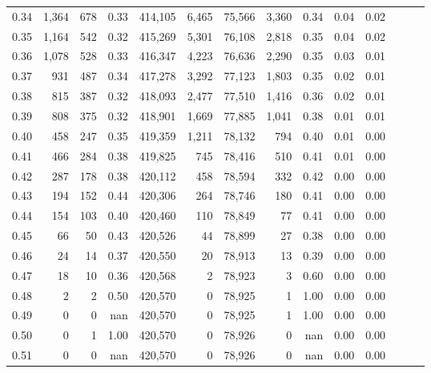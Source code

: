 \begin{tabular}{rrrrrrrrrrrrrr}
0.34 &   1,364 &    678 &  0.33 &  414,105 &    6,465 &  75,566 &   3,360 &  0.34 &  0.04 &      0.02 \\
0.35 &   1,164 &    542 &  0.32 &  415,269 &    5,301 &  76,108 &   2,818 &  0.35 &  0.04 &      0.02 \\
0.36 &   1,078 &    528 &  0.33 &  416,347 &    4,223 &  76,636 &   2,290 &  0.35 &  0.03 &      0.01 \\
0.37 &     931 &    487 &  0.34 &  417,278 &    3,292 &  77,123 &   1,803 &  0.35 &  0.02 &      0.01 \\
0.38 &     815 &    387 &  0.32 &  418,093 &    2,477 &  77,510 &   1,416 &  0.36 &  0.02 &      0.01 \\
0.39 &     808 &    375 &  0.32 &  418,901 &    1,669 &  77,885 &   1,041 &  0.38 &  0.01 &      0.01 \\
0.40 &     458 &    247 &  0.35 &  419,359 &    1,211 &  78,132 &     794 &  0.40 &  0.01 &      0.00 \\
0.41 &     466 &    284 &  0.38 &  419,825 &      745 &  78,416 &     510 &  0.41 &  0.01 &      0.00 \\
0.42 &     287 &    178 &  0.38 &  420,112 &      458 &  78,594 &     332 &  0.42 &  0.00 &      0.00 \\
0.43 &     194 &    152 &  0.44 &  420,306 &      264 &  78,746 &     180 &  0.41 &  0.00 &      0.00 \\
0.44 &     154 &    103 &  0.40 &  420,460 &      110 &  78,849 &      77 &  0.41 &  0.00 &      0.00 \\
0.45 &      66 &     50 &  0.43 &  420,526 &       44 &  78,899 &      27 &  0.38 &  0.00 &      0.00 \\
0.46 &      24 &     14 &  0.37 &  420,550 &       20 &  78,913 &      13 &  0.39 &  0.00 &      0.00 \\
0.47 &      18 &     10 &  0.36 &  420,568 &        2 &  78,923 &       3 &  0.60 &  0.00 &      0.00 \\
0.48 &       2 &      2 &  0.50 &  420,570 &        0 &  78,925 &       1 &  1.00 &  0.00 &      0.00 \\
0.49 &       0 &      0 &   nan &  420,570 &        0 &  78,925 &       1 &  1.00 &  0.00 &      0.00 \\
0.50 &       0 &      1 &  1.00 &  420,570 &        0 &  78,926 &       0 &   nan &  0.00 &      0.00 \\
0.51 &       0 &      0 &   nan &  420,570 &        0 &  78,926 &       0 &   nan &  0.00 &      0.00 \\

\end{tabular}
